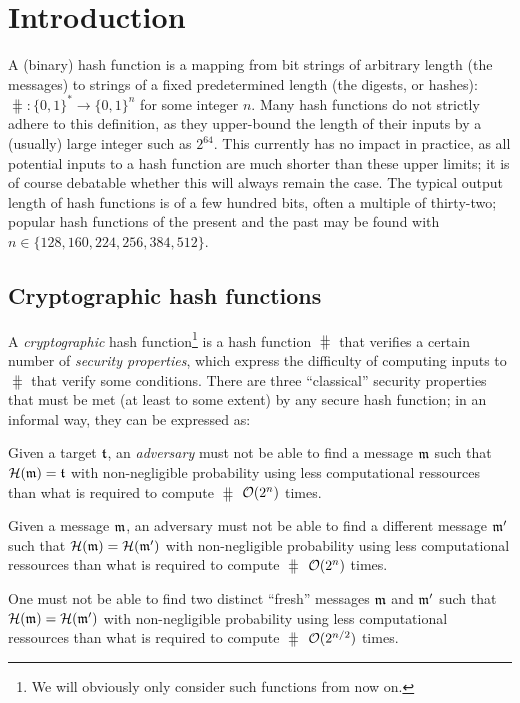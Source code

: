 \section{Introduction}
\label{sec:intro}

A (binary) hash function is a mapping from bit strings of arbitrary length (the messages) to strings of a fixed predetermined length (the digests, or hashes):
$\hash : \{0,1\}^* \rightarrow \{0,1\}^n$ for some integer $n$.
Many hash functions do not strictly adhere to this definition, as they upper-bound the length of their inputs by a (usually) large integer such as $2^{64}$. This currently has
no impact in practice, as all potential inputs to a hash function are much shorter than these upper limits; it is of course debatable whether this will always remain the case. 
The typical output length of hash functions is of a few hundred bits, often a multiple of thirty-two; popular hash functions of the present and the past may be found with
$n \in \{128, 160, 224, 256, 384, 512\}$.

\subsection{Cryptographic hash functions}

A \emph{cryptographic} hash function\footnote{We will obviously only consider such functions from now on.} is a hash function $\hash$ that verifies a certain number of \emph{security properties}, which express the difficulty of computing inputs
to $\hash$ that verify some conditions. There are three ``classical'' security properties that must be met (at least to some extent)
by any secure hash function; in an informal way, they can be expressed as:
\begin{defi} Given a target $\mathfrak{t}$, an \emph{adversary} must not be able to find a message $\mathfrak{m}$ such that $\operatorname{\mathcal{H}}(\mathfrak{m}) = \mathfrak{t}$ with non-negligible probability using
less computational ressources than what is required to compute $\hash$ $\operatorname{\mathcal{O}}(2^n)$ times.
\label{def:pre}
\end{defi}
\begin{defi} Given a message $\mathfrak{m}$, an adversary must not be able to find a different message $\mathfrak{m}'$ such that
$\operatorname{\mathcal{H}}(\mathfrak{m}) = \operatorname{\mathcal{H}}(\mathfrak{m}')$  with non-negligible probability using less computational ressources than what is required to compute $\hash$ $\operatorname{\mathcal{O}}(2^n)$ times.
\label{def:2pre}
\end{defi}
\begin{defi} One must not be able to find two distinct ``fresh'' messages $\mathfrak{m}$ and $\mathfrak{m}'$ such that $\operatorname{\mathcal{H}}(\mathfrak{m}) =
\operatorname{\mathcal{H}}(\mathfrak{m}')$ with non-negligible probability using less computational ressources than what is required to compute $\hash$ $\operatorname{\mathcal{O}}(2^{n/2})$ times.
\label{def:coll}
\end{defi}

